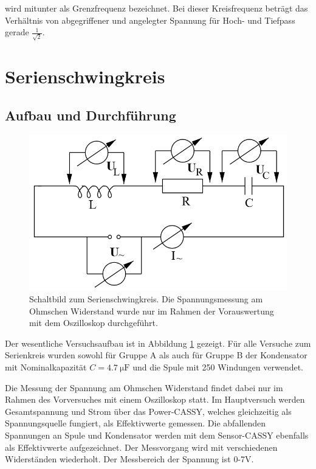 \documentclass[12pt,a4paper]{article}
\begin{document}
wird mitunter als Grenzfrequenz bezeichnet. Bei dieser Kreisfrequenz beträgt das Verhältnis von abgegriffener und angelegter Spannung für Hoch- und Tiefpass gerade $\frac{1}{\sqrt{2}}$.

\section{Serienschwingkreis}

\subsection{Aufbau und Durchführung}

\begin{figure}
\centering
\includegraphics[scale=0.8]{Bilder/AufbauSerie.png}
\caption{Schaltbild zum Serienschwingkreis. Die Spannungsmessung am Ohmschen Widerstand wurde nur im Rahmen der Vorauswertung mit dem Oszilloskop durchgeführt.}
\label{fig:AufbauSerie}
\end{figure}

Der wesentliche Versuchsaufbau ist in Abbildung \ref{fig:AufbauSerie} gezeigt. Für alle Versuche zum Serienkreis wurden sowohl für Gruppe A als auch für Gruppe B der Kondensator mit Nominalkapazität $C=\SI{4,7}{\micro \F}$ und die Spule mit 250 Windungen verwendet.

Die Messung der Spannung am Ohmschen Widerstand findet dabei nur im Rahmen des Vorversuches mit einem Oszilloskop statt.
Im Hauptversuch werden Gesamtspannung und Strom über das Power-CASSY, welches gleichzeitig als Spannungsquelle fungiert, als Effektivwerte gemessen. Die abfallenden Spannungen an Spule und Kondensator werden mit dem Sensor-CASSY ebenfalls als Effektivwerte aufgezeichnet. Der Messvorgang wird mit verschiedenen Widerständen wiederholt. Der Messbereich der Spannung ist 0-7V.
\end{document}
